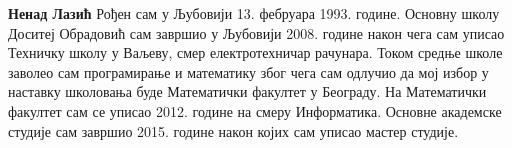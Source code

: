 \documentclass[12pt,oneside]{memoir}
\theoremstyle{remark}
\begin{document}
\literatura




\backmatter

\begin{biografija}
\textbf{Ненад Лазић} 
Рођен сам у Љубовији 13. фебруара 1993. године. Основну школу Доситеј Обрадовић сам завршио у Љубовији 2008. године 
након чега сам уписао Техничку школу у Ваљеву, смер електротехничар рачунара. Током средње школе заволео сам програмирање
и математику због чега сам одлучио да мој избор у наставку школовања буде Математички факултет у Београду. На Математички факултет
сам се уписао 2012. године на смеру Информатика. Основне академске студије сам завршио 2015. године након којих сам уписао мастер студије.

\end{biografija}
\end{document}
